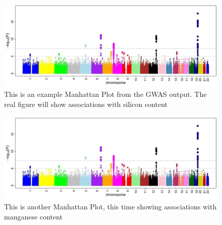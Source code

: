 \documentclass[12pt, letterpaper, ]{report}
\begin{document}
\begin{figure}[h]
        \includegraphics{images/Manhattan_Plot.png}
        \centering
        \caption{This is an example Manhattan Plot from the GWAS output. The real figure will show associations with silicon content}
        \label{Fig:si_peak_plot}
\end{figure}

\begin{figure}[h]
        \includegraphics{images/Manhattan_Plot.png}
        \centering
        \caption{This is another Manhattan Plot, this time showing associations with manganese content}
        \label{Fig:mn_peak_plot}
\end{figure}



\clearpage
\end{document}
